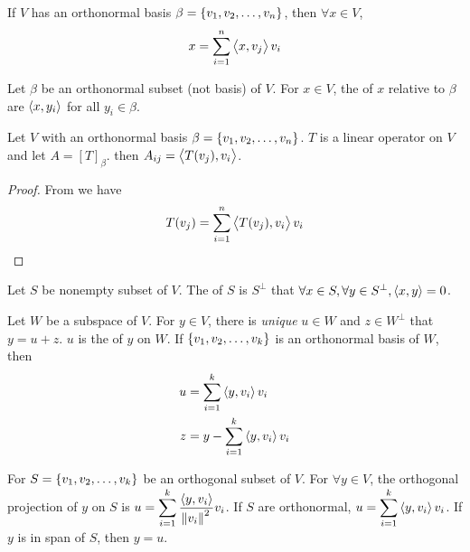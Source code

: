 \begin{theorem}\label{vectorinorthonormalbasis}
	If $V$ has an orthonormal basis $\beta=\set{v_1,v_2,\dots,v_n}$, then $\forall x\in V$, 
	\begin{equation}
		x = \sum_{i=1}^n \left\langle \displaystyle x, v_j \right\rangle v_i
	\end{equation}
\end{theorem}

\begin{definition}
    Let $\beta$ be an orthonormal subset (not basis) of $V$. For $x \in V$, the  of $x$ relative to $\beta$ are $\left\langle \displaystyle x, y_i \right\rangle$ for all $y_i \in \beta$.
\end{definition}


\begin{theorem}
	Let $V$ with an orthonormal basis $\beta=\set{v_1,v_2,\dots,v_n}$. $T$ is a linear operator on $V$ and let $A=[T]_\beta$. then $A_{ij}=\left\langle \displaystyle T(v_j), v_i \right\rangle$.
\end{theorem}
\begin{proof}
	From  we have
	\begin{equation*}
		T(v_j) = \sum_{i=1}^n \left\langle \displaystyle T(v_j), v_i \right\rangle v_i
	\end{equation*}
\end{proof}

\begin{definition}
    Let $S$ be nonempty subset of $V$. The  of $S$ is $S^\bot$ that $\forall x \in S, \forall y \in S^\bot, \left\langle \displaystyle x, y \right\rangle = 0$.
\end{definition}

\begin{theorem}\label{orthogonalprojection}
    Let $W$ be a subspace of $V$. For $y \in V$, there is \emph{unique} $u \in W$ and $z \in W^\bot$ that $y = u + z$. $u$ is the  of $y$ on $W$. If $\set{v_1, v_2, \dots, v_k}$ is an orthonormal basis of $W$, then 
    \begin{equation}
        \begin{aligned}
            u &= \sum_{i=1}^k \left\langle \displaystyle y, v_i \right\rangle v_i \\
            z &= y -   \sum_{i=1}^k \left\langle \displaystyle y, v_i \right\rangle v_i          
        \end{aligned}
    \end{equation}
\end{theorem}


\begin{theorem}
    For $S=\set{v_1, v_2, \dots, v_k}$ be an orthogonal subset of $V$. For $\forall y \in V$, the orthogonal projection of $y$ on $S$ is $\displaystyle u = \sum_{i=1}^k \frac{\left\langle \displaystyle y, v_i \right\rangle}{\norm{v_i}^2} v_i$. If $S$ are orthonormal, $\displaystyle u = \sum_{i=1}^k \left\langle \displaystyle y, v_i \right\rangle v_i$. If $y$ is in span of $S$, then $y = u$.
\end{theorem}



